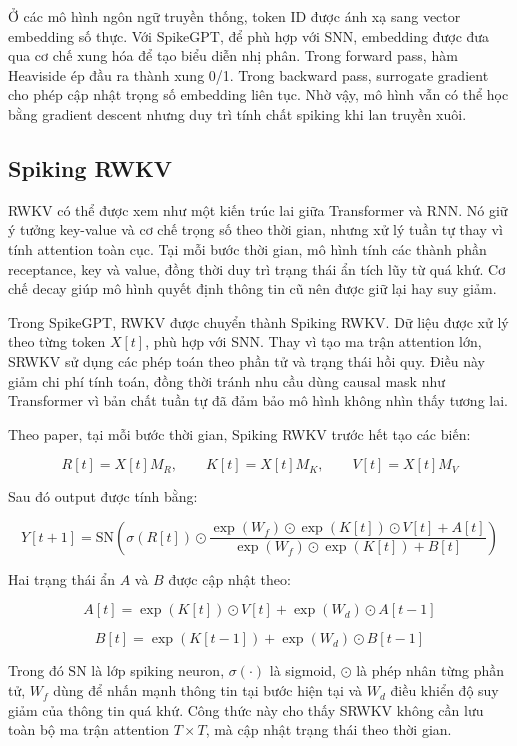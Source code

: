 \documentclass[12pt,a4paper,oneside]{report}
\newlength{\manualparindent}
\newcommand{\manualindent}{\hspace*{\manualparindent}}
\begin{document}
\manualindent%
Ở các mô hình ngôn ngữ truyền thống, token ID được ánh xạ sang vector embedding số thực. Với SpikeGPT, để phù hợp với SNN, embedding được đưa qua cơ chế xung hóa để tạo biểu diễn nhị phân. Trong forward pass, hàm Heaviside ép đầu ra thành xung 0/1. Trong backward pass, surrogate gradient cho phép cập nhật trọng số embedding liên tục. Nhờ vậy, mô hình vẫn có thể học bằng gradient descent nhưng duy trì tính chất spiking khi lan truyền xuôi.

\subsection{Spiking RWKV}

\manualindent%
RWKV có thể được xem như một kiến trúc lai giữa Transformer và RNN. Nó giữ ý tưởng key-value và cơ chế trọng số theo thời gian, nhưng xử lý tuần tự thay vì tính attention toàn cục. Tại mỗi bước thời gian, mô hình tính các thành phần receptance, key và value, đồng thời duy trì trạng thái ẩn tích lũy từ quá khứ. Cơ chế decay giúp mô hình quyết định thông tin cũ nên được giữ lại hay suy giảm.

\manualindent%
Trong SpikeGPT, RWKV được chuyển thành Spiking RWKV. Dữ liệu được xử lý theo từng token \(X[t]\), phù hợp với SNN. Thay vì tạo ma trận attention lớn, SRWKV sử dụng các phép toán theo phần tử và trạng thái hồi quy. Điều này giảm chi phí tính toán, đồng thời tránh nhu cầu dùng causal mask như Transformer vì bản chất tuần tự đã đảm bảo mô hình không nhìn thấy tương lai.

\manualindent%
Theo paper, tại mỗi bước thời gian, Spiking RWKV trước hết tạo các biến:

\[
R[t]=X[t]M_R,\qquad K[t]=X[t]M_K,\qquad V[t]=X[t]M_V
\]

Sau đó output được tính bằng:

\[
Y[t+1]=
\mathrm{SN}\left(
\sigma(R[t])\odot
\frac{
\exp(W_f)\odot\exp(K[t])\odot V[t] + A[t]
}{
\exp(W_f)\odot\exp(K[t]) + B[t]
}
\right)
\]

Hai trạng thái ẩn \(A\) và \(B\) được cập nhật theo:

\[
A[t]=\exp(K[t])\odot V[t] + \exp(W_d)\odot A[t-1]
\]

\[
B[t]=\exp(K[t-1])+\exp(W_d)\odot B[t-1]
\]

\manualindent%
Trong đó \(\mathrm{SN}\) là lớp spiking neuron, \(\sigma(\cdot)\) là sigmoid, \(\odot\) là phép nhân từng phần tử, \(W_f\) dùng để nhấn mạnh thông tin tại bước hiện tại và \(W_d\) điều khiển độ suy giảm của thông tin quá khứ. Công thức này cho thấy SRWKV không cần lưu toàn bộ ma trận attention \(T\times T\), mà cập nhật trạng thái theo thời gian.
\end{document}
